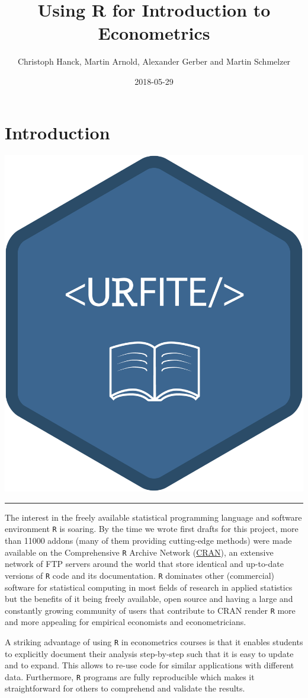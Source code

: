 \documentclass[]{book}
\title{Using R for Introduction to Econometrics}
\author{Christoph Hanck, Martin Arnold, Alexander Gerber and Martin Schmelzer}
\date{2018-05-29}
\theoremstyle{definition}
\theoremstyle{definition}
\theoremstyle{definition}
\theoremstyle{remark}
\begin{document}
\maketitle

{
\setcounter{tocdepth}{1}
\tableofcontents
}
\chapter{Introduction}\label{introduction}

\begin{center}\includegraphics[width=0.45\linewidth]{images/URFITE_logo} \end{center}

\noindent\rule{\textwidth}{1pt}

The interest in the freely available statistical programming language
and software environment \texttt{R} is soaring. By the time we wrote
first drafts for this project, more than 11000 addons (many of them
providing cutting-edge methods) were made available on the Comprehensive
\texttt{R} Archive Network (\href{https://cran.r-project.org/}{CRAN}),
an extensive network of FTP servers around the world that store
identical and up-to-date versions of \texttt{R} code and its
documentation. \texttt{R} dominates other (commercial) software for
statistical computing in most fields of research in applied statistics
but the benefits of it being freely available, open source and having a
large and constantly growing community of users that contribute to CRAN
render \texttt{R} more and more appealing for empirical economists and
econometricians.

A striking advantage of using \texttt{R} in econometrics courses is that
it enables students to explicitly document their analysis step-by-step
such that it is easy to update and to expand. This allows to re-use code
for similar applications with different data. Furthermore, \texttt{R}
programs are fully reproducible which makes it straightforward for
others to comprehend and validate the results.
\end{document}
